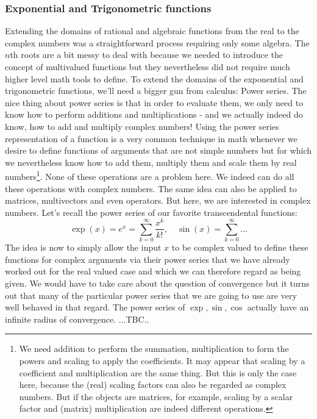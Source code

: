 \subsubsection{Exponential and Trigonometric functions}
Extending the domains of rational and algebraic functions from the real to the complex numbers was a straightforward process requiring only some algebra. The $n$th roots are a bit messy to deal with because we needed to introduce the concept of multivalued functions but they nevertheless did not require much higher level math tools to define. To extend the domains of the exponential and trigonometric functions, we'll need a bigger gun from calculus: Power series. The nice thing about power series is that in order to evaluate them, we only need to know how to perform additions and multiplications - and we actually indeed do know, how to add and multiply complex numbers! Using the power series representation of a function is a very common technique in math whenever we desire to define functions of arguments that are not simple numbers but for which we nevertheless know how to add them, multiply them and scale them by real numbers\footnote{We need addition to perform the summation, multiplication to form the powers and scaling to apply the coefficients. It may appear that scaling by a coefficient and multiplication are the same thing. But this is only the case here, because the (real) scaling factors can also be regarded as complex numbers. But if the objects are matrices, for example, scaling by a scalar factor and (matrix) multiplication are indeed different operations.}. None of these operations are a problem here. We indeed can do all these operations with complex numbers. The same idea can also be applied to matrices, multivectors and even operators. But here, we are interested in complex numbers. Let's recall the power series of our favorite transcendental functions:
\begin{equation}
 \exp(x) = e^x = \sum_{k=0}^{\infty} \frac{x^k}{k!}, \quad
 \sin(x) =  \sum_{k=0}^{\infty} ...
\end{equation}
The idea is now to simply allow the input $x$ to be complex valued to define these functions for complex arguments via their power series that we have already worked out for the real valued case and which we can therefore regard as being given. We would have to take care about the question of convergence but it turns out that many of the particular power series that we are going to use are very well behaved in that regard. The power series of $\exp, \sin, \cos$ actually have an infinite radius of convergence. ...TBC..

